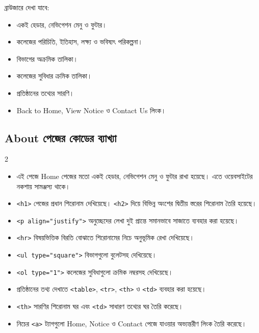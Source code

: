 ব্রাউজারে দেখা যাবে:
\par\noindent
\begin{minipage}[t]{.48\linewidth}\vspace{0pt}
\begin{itemize}
\item একই হেডার, নেভিগেশন মেনু ও ফুটার।
\item কলেজের পরিচিতি, ইতিহাস, লক্ষ্য ও ভবিষ্যৎ পরিকল্পনা।
\item বিভাগের অক্রমিক তালিকা।
\end{itemize}
\end{minipage}\hfill
\begin{minipage}[t]{.48\linewidth}\vspace{0pt}
\begin{itemize}
\item কলেজের সুবিধার ক্রমিক তালিকা।
\item প্রতিষ্ঠানের তথ্যের সারণি।
\item Back to Home, View Notice ও Contact Us লিংক।
\end{itemize}
\end{minipage}\par


\subsection{About পেজের কোডের ব্যাখ্যা}

\par\noindent
\begin{multicols}{2}
\begin{itemize}
\item এই পেজে Home পেজের মতো একই হেডার, নেভিগেশন মেনু ও ফুটার রাখা হয়েছে। এতে ওয়েবসাইটের নকশায় সামঞ্জস্য থাকে।
\item \texttt{<h1>} পেজের প্রধান শিরোনাম দেখিয়েছে। \texttt{<h2>} দিয়ে বিভিন্ন অংশের দ্বিতীয় স্তরের শিরোনাম তৈরি হয়েছে।
\item \texttt{<p align="justify">} অনুচ্ছেদের লেখা দুই প্রান্তে সমানভাবে সাজাতে ব্যবহার করা হয়েছে।
\item \texttt{<hr>} বিষয়ভিত্তিক বিরতি বোঝাতে শিরোনামের নিচে অনুভূমিক রেখা দেখিয়েছে।
\item \texttt{<ul type="square">} বিভাগগুলো বুলেটসহ দেখিয়েছে।


\item \texttt{<ol type="1">} কলেজের সুবিধাগুলো ক্রমিক নম্বরসহ দেখিয়েছে।
\item প্রতিষ্ঠানের তথ্য দেখাতে \texttt{<table>}, \texttt{<tr>}, \texttt{<th>} ও \texttt{<td>} ব্যবহার করা হয়েছে।
\item \texttt{<th>} সারণির শিরোনাম ঘর এবং \texttt{<td>} সাধারণ তথ্যের ঘর তৈরি করেছে।
\item নিচের \texttt{<a>} ট্যাগগুলো Home, Notice ও Contact পেজে যাওয়ার অভ্যন্তরীণ লিংক তৈরি করেছে।
\end{itemize}
\end{multicols}
\par


